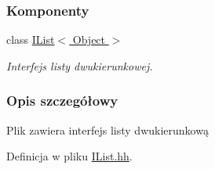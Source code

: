 \subsubsection*{Komponenty}
\begin{DoxyCompactItemize}
\item 
class \hyperlink{class_i_list}{I\-List$<$ Object $>$}
\begin{DoxyCompactList}\small\item\em Interfejs listy dwukierunkowej. \end{DoxyCompactList}\end{DoxyCompactItemize}


\subsubsection{Opis szczegółowy}
Plik zawiera interfejs listy dwukierunkową 

Definicja w pliku \hyperlink{_i_list_8hh_source}{I\-List.\-hh}.


